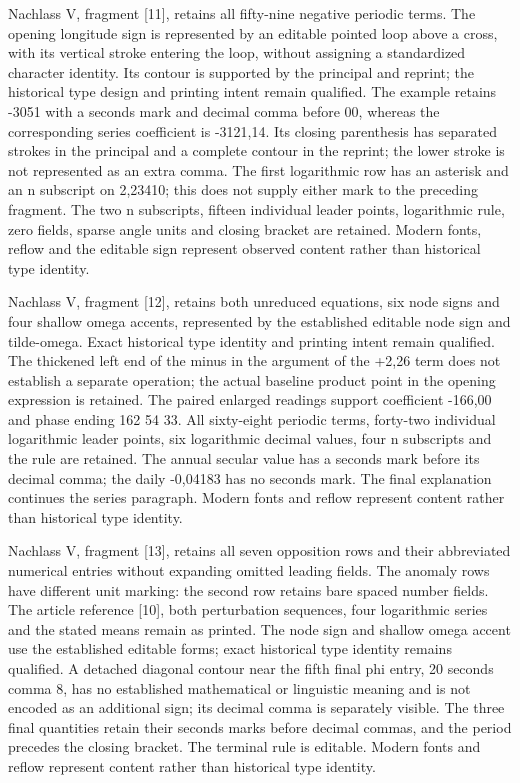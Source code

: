 Nachlass V, fragment [11], retains all fifty-nine negative periodic terms. The opening longitude sign is represented by an editable pointed loop above a cross, with its vertical stroke entering the loop, without assigning a standardized character identity. Its contour is supported by the principal and reprint; the historical type design and printing intent remain qualified. The example retains -3051 with a seconds mark and decimal comma before 00, whereas the corresponding series coefficient is -3121,14. Its closing parenthesis has separated strokes in the principal and a complete contour in the reprint; the lower stroke is not represented as an extra comma. The first logarithmic row has an asterisk and an n subscript on 2,23410; this does not supply either mark to the preceding fragment. The two n subscripts, fifteen individual leader points, logarithmic rule, zero fields, sparse angle units and closing bracket are retained. Modern fonts, reflow and the editable sign represent observed content rather than historical type identity.

Nachlass V, fragment [12], retains both unreduced equations, six node signs and four shallow omega accents, represented by the established editable node sign and tilde-omega. Exact historical type identity and printing intent remain qualified. The thickened left end of the minus in the argument of the +2,26 term does not establish a separate operation; the actual baseline product point in the opening expression is retained. The paired enlarged readings support coefficient -166,00 and phase ending 162 54 33. All sixty-eight periodic terms, forty-two individual logarithmic leader points, six logarithmic decimal values, four n subscripts and the rule are retained. The annual secular value has a seconds mark before its decimal comma; the daily -0,04183 has no seconds mark. The final explanation continues the series paragraph. Modern fonts and reflow represent content rather than historical type identity.

Nachlass V, fragment [13], retains all seven opposition rows and their abbreviated numerical entries without expanding omitted leading fields. The anomaly rows have different unit marking: the second row retains bare spaced number fields. The article reference [10], both perturbation sequences, four logarithmic series and the stated means remain as printed. The node sign and shallow omega accent use the established editable forms; exact historical type identity remains qualified. A detached diagonal contour near the fifth final phi entry, 20 seconds comma 8, has no established mathematical or linguistic meaning and is not encoded as an additional sign; its decimal comma is separately visible. The three final quantities retain their seconds marks before decimal commas, and the period precedes the closing bracket. The terminal rule is editable. Modern fonts and reflow represent content rather than historical type identity.

